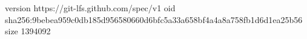 version https://git-lfs.github.com/spec/v1
oid sha256:9bebea959c0db185d956580660d6bfc5a33a658bf4a4a8a758fb1d6d1ea25b56
size 1394092
